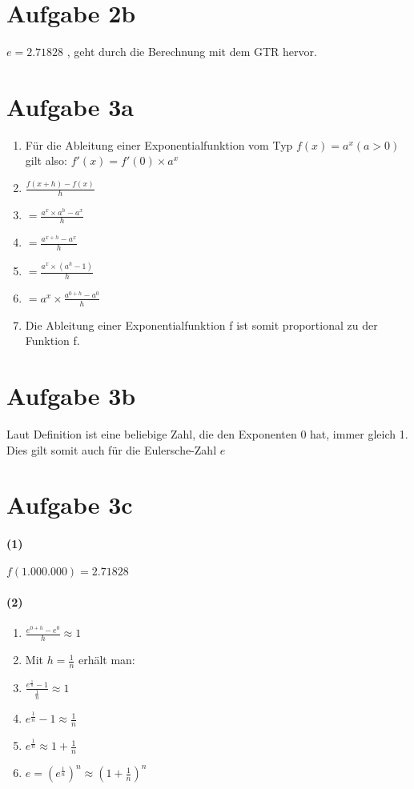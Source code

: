 \documentclass[12pt, a4paper]{report}
\begin{document}
	\section{Aufgabe 2b}
	\Large$e=2.71828$\normalsize
	, geht durch die Berechnung mit dem GTR hervor.
	
	\newpage
	
	\section{Aufgabe 3a}
	\begin{enumerate}
		\item Für die Ableitung einer Exponentialfunktion vom Typ $f(x) = a^x (a>0)$ gilt also: $f'(x) = f'(0) \times a^x$
		\item $\frac{f(x+h) - f(x)}{h}$
		\item $=\frac{a^x \times a^h - a^x}{h}$
		\item $=\frac{a^{x+h} - a^x}{h}$
		\item $=\frac{a^x \times (a^h - 1)}{h}$
		\item $=a^x \times \frac{a^{0+h} - a^0}{h}$
		\item Die Ableitung einer Exponentialfunktion f ist somit proportional zu der Funktion f.
	\end{enumerate}
	
	\section{Aufgabe 3b}
	Laut Definition ist eine beliebige Zahl, die den Exponenten 0 hat, immer gleich 1.
	Dies gilt somit auch für die Eulersche-Zahl $e$
	
	\section{Aufgabe 3c}
	\paragraph{(1)}
	$f(1.000.000) = 2.71828$
	
	\paragraph{(2)}
	\begin{enumerate}
		\item $\frac{e^{0+h}-e^0}{h} \approx 1$
		\item Mit $h=\frac{1}{n}$ erhält man:
		\item $\frac{e^{\frac{1}{n}}-1}{\frac{1}{n}} \approx 1$
		\item $e^{\frac{1}{n}} - 1 \approx \frac{1}{n}$
		\item $e^{\frac{1}{n}} \approx 1 + \frac{1}{n}$
		\item $e = (e^{\frac{1}{n}})^n \approx (1 + \frac{1}{n})^n$
	\end{enumerate}
	
\end{document}
